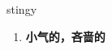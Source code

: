 
\begin{frame}
{\huge stingy}
\begin{center}
\begin{enumerate}\Large
  \item \textbf{小气的，吝啬的}
\end{enumerate}
\end{center}
\end{frame}
